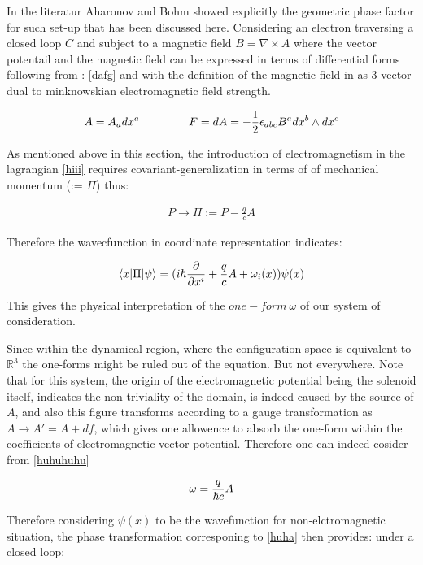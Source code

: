 \documentclass[8pt, twocoloumn]{article}
\begin{document}
In the literatur \cite{ab} Aharonov and Bohm showed explicitly the geometric phase factor for such set-up that has been discussed here. 
Considering an electron traversing a closed loop $C$ and subject to a magnetic field $B=\nabla \times A$ where the vector potentail and the magnetic field can be expressed in terms of differential forms following from : \ref{dafg} and with the definition of the magnetic field in as 3-vector dual to minknowskian electromagnetic field strength.

\begin{align}{\label{hehye}}
A = A_a dx^a \ \ \ \ \ \ \ \ \ \ \ \ \ F = dA = -\frac{1}{2}\epsilon_{abc} B^{a} dx^{b} \wedge dx^{c}
\end{align}

As mentioned above in this section, the introduction of electromagnetism in the lagrangian \ref{hiii} requires covariant-generalization in terms of of mechanical momentum (:= $\Pi$) thus:

\begin{align}
P \to \Pi := P - \frac{q}{c}A 
\end{align} 

Therefore the wavecfunction in coordinate representation indicates: 

\begin{align}
\braket{x|\Pi|\psi} = (i \hbar \frac{\partial }{\partial x^i}+ \frac{q}{c}A + \omega_i(x)) \psi(x)
\end{align}

This gives the physical interpretation of the $one-form \ \omega$ of our system of consideration.

Since within the dynamical region, where the configuration space is equivalent to $\mathbb{R}^3$ the one-forms might be ruled out of the equation. But not everywhere. Note that for this system, the origin of the electromagnetic potential being the solenoid itself, indicates the non-triviality of the domain, is indeed caused by the source of $A$, and also this figure transforms according to a gauge transformation as $A \to A' = A+df$, which gives one allowence to absorb the one-form within the coefficients of electromagnetic vector potential. Therefore one can indeed cosider from \ref{huhuhuhu}

\begin{align}{\label{connectinemememe}}
\omega = \frac{q}{\hbar c}A
\end{align}

Therefore considering $\psi(x)$ to be the wavefunction for non-elctromagnetic situation, the phase transformation corresponing to \ref{huha} then provides: under a closed loop:
\end{document}
